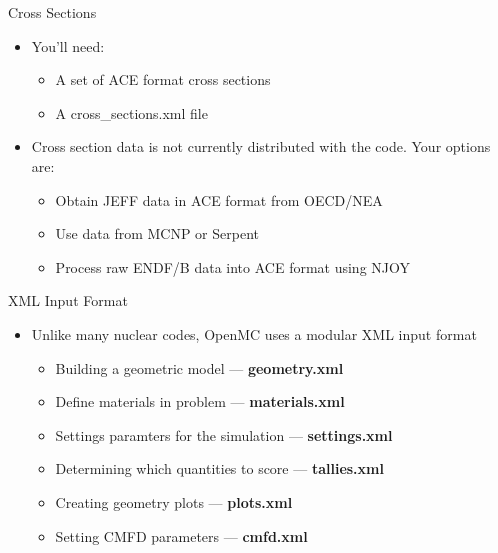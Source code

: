 \documentclass[serif]{beamer}
\begin{document}

\begin{frame}{Cross Sections}
  \begin{itemize}
  \item<1-> You'll need:
    \begin{itemize}
    \vfill
    \item<1-> A set of ACE format cross sections
    \vfill
    \item<1-> A cross\_sections.xml file
    \vfill
    \end{itemize}
  \vfill
  \item<1-> Cross section data is not currently distributed with the code. Your
    options are:
    \begin{itemize}
    \vfill
    \item<1-> Obtain JEFF data in ACE format from OECD/NEA
    \vfill
    \item<1-> Use data from MCNP or Serpent
    \vfill
    \item<1-> Process raw ENDF/B data into ACE format using NJOY
    \vfill
    \end{itemize}
  \end{itemize}
\end{frame}


\begin{frame}{XML Input Format}
  \begin{itemize}
  \item<1-> Unlike many nuclear codes, OpenMC uses a modular XML input format
    \begin{itemize}
    \vfill
    \item<1-> Building a geometric model --- \textbf{geometry.xml}
    \vfill
    \item<1-> Define materials in problem --- \textbf{materials.xml}
    \vfill
    \item<1-> Settings paramters for the simulation --- \textbf{settings.xml}
    \vfill
    \item<1-> Determining which quantities to score --- \textbf{tallies.xml}
    \vfill
    \item<1-> Creating geometry plots --- \textbf{plots.xml}
    \vfill
    \item<1-> Setting CMFD parameters --- \textbf{cmfd.xml}
    \vfill
    \end{itemize}
  \end{itemize}
\end{frame}
\end{document}
